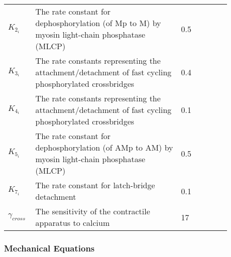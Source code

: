\begin{table}[h!]
\centering
\begin{tabular}{| p{0.09\linewidth} | >{\footnotesize} p{0.6\linewidth} | >{\footnotesize} p{0.17\linewidth} | >{\footnotesize} p{0.02\linewidth} |}
\arrayrulecolor{lightgrey}\hline
$K_{2_{i}}$      	& The rate constant for dephosphorylation (of Mp to M) by myosin light-chain phosphatase (MLCP)																			 & 0.5 \pers & \cite{Hai1989} \\
$K_{3_{i}}$      	& The rate constants representing the attachment/detachment of fast cycling phosphorylated crossbridges																	 & 0.4 \pers	& \cite{Hai1989} \\
$K_{4_{i}}$      	& The rate constants representing the attachment/detachment of fast cycling phosphorylated crossbridges 																	 & 0.1 \pers	& \cite{Hai1989} \\
$K_{5_{i}}$      & The rate constant for dephosphorylation (of AMp to AM) by myosin light-chain phosphatase (MLCP)																			 & 0.5 \pers	& \cite{Hai1989} \\
$K_{7_{i}}$      	& The rate constant for latch-bridge detachment					& 0.1 \pers	& \cite{Koenigsberger2006} \\
$\gamma_{cross}$      	& The sensitivity of the contractile apparatus to calcium		& 17 \puMdries	& \cite{Koenigsberger2006} \\
\hline
\end{tabular}
\label{tab:crossbridge}
\end{table}
\newpage
\subsubsection{Mechanical Equations}

